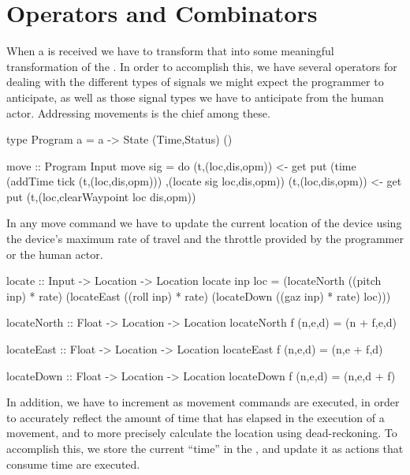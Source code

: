 \documentclass[11pt]{article}
\begin{document}


\section{Operators and Combinators}
\label{sec:comb}
When a  is received we have to transform that into some
meaningful transformation of the . In order to accomplish this, we
have several operators for dealing with the different types of signals we
might expect the programmer to anticipate, as well as those signal types we
have to anticipate from the human actor. Addressing movements is the chief
among these.

\begin{program}
type Program a = a -> State (Time,Status) ()

move :: Program Input
move sig = do (t,(loc,dis,opm)) <- get
              put (time (addTime tick (t,(loc,dis,opm)))
                  ,(locate sig loc,dis,opm))
              (t,(loc,dis,opm)) <- get
              put (t,(loc,clearWaypoint loc dis,opm))
\end{program}

In any move command we have to update the current location of the device using
the device's maximum rate of travel and the throttle provided by the
programmer or the human actor.

\begin{program}
locate :: Input -> Location -> Location
locate inp loc = (locateNorth ((pitch inp) * rate)
                  (locateEast ((roll inp) * rate)
                   (locateDown ((gaz inp) * rate) loc)))

locateNorth :: Float -> Location -> Location
locateNorth f (n,e,d) = (n + f,e,d)

locateEast :: Float -> Location -> Location
locateEast f (n,e,d) = (n,e + f,d)

locateDown :: Float -> Location -> Location
locateDown f (n,e,d) = (n,e,d + f)
\end{program}

In addition, we have to increment  as movement commands are
executed, in order to accurately reflect the amount of time that has elapsed
in the execution of a movement, and to more precisely calculate the location
using dead-reckoning. To accomplish this, we store the current ``time'' in the
, and update it as actions that consume time are executed.
\end{document}
